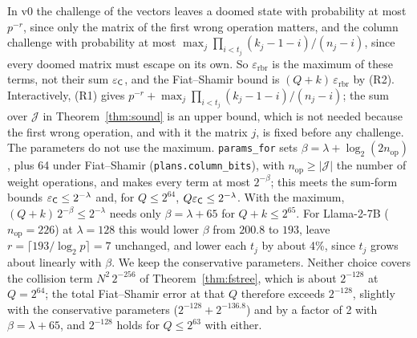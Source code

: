 \begin{remark}
\label{rem:rbr-max}
In v0 the challenge of the vectors leaves a doomed state with probability at most $p^{-r}$, since
only the matrix of the first wrong operation matters, and the column challenge with probability at
most $\max_j\prod_{i<t_j}(k_j-1-i)/(n_j-i)$, since every doomed matrix must escape on its own. So
$\varepsilon_{\mathrm{rbr}}$ is the maximum of these terms, not their sum $\varepsilon_{\mathsf{C}}$, and
the Fiat--Shamir bound is $(Q+k)\,\varepsilon_{\mathrm{rbr}}$ by (R2). Interactively, (R1) gives
$p^{-r}+\max_j\prod_{i<t_j}(k_j-1-i)/(n_j-i)$; the sum over $\mathcal J$ in
Theorem~\ref{thm:sound} is an upper bound, which is not needed because the first wrong operation,
and with it the matrix $j$, is fixed before any challenge.
The parameters do not use the maximum. \texttt{params\_for} sets
$\beta=\lambda+\log_2(2n_{\mathrm{op}})$, plus 64 under Fiat--Shamir (\texttt{plans.column\_bits}),
with $n_{\mathrm{op}}\ge|\mathcal J|$ the number of weight operations, and makes every term at most
$2^{-\beta}$; this meets the sum-form bounds $\varepsilon_{\mathsf{C}}\le2^{-\lambda}$ and, for
$Q\le2^{64}$, $Q\varepsilon_{\mathsf{C}}\le2^{-\lambda}$. With the maximum, $(Q+k)\,2^{-\beta}\le2^{-\lambda}$
needs only $\beta=\lambda+65$ for $Q+k\le2^{65}$. For Llama-2-7B ($n_{\mathrm{op}}=226$) at
$\lambda=128$ this would lower $\beta$ from $200.8$ to $193$, leave
$r=\lceil193/\log_2p\rceil=7$ unchanged, and lower each $t_j$ by about 4\%, since $t_j$ grows about
linearly with $\beta$. We keep the conservative parameters. Neither choice covers the collision term
$N^2\,2^{-256}$ of Theorem~\ref{thm:fstree}, which is about $2^{-128}$ at $Q=2^{64}$; the total
Fiat--Shamir error at that $Q$ therefore exceeds $2^{-128}$, slightly with the conservative
parameters ($2^{-128}+2^{-136.8}$) and by a factor of 2 with $\beta=\lambda+65$, and $2^{-128}$
holds for $Q\le2^{63}$ with either.
\end{remark}

